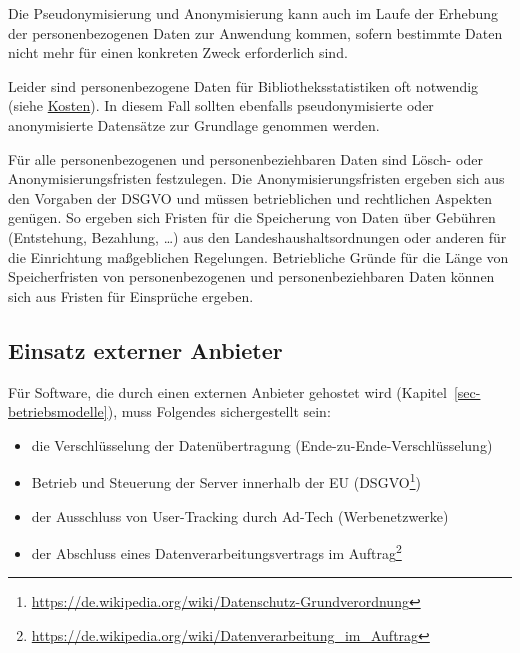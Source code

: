 \documentclass[
  11pt,
  letterpaper,
  DIV=11,
  twoside]{scrreprt}
\DeclareRobustCommand{\href}[2]{#2\footnote{\url{#1}}}
\begin{document}
Die Pseudonymisierung und Anonymisierung kann auch im Laufe der Erhebung
der personenbezogenen Daten zur Anwendung kommen, sofern bestimmte Daten
nicht mehr für einen konkreten Zweck erforderlich sind.

Leider sind personenbezogene Daten für Bibliotheksstatistiken oft
notwendig (siehe \hyperref[kosten]{Kosten}). In diesem Fall sollten
ebenfalls pseudonymisierte oder anonymisierte Datensätze zur Grundlage
genommen werden.

Für alle personenbezogenen und personenbeziehbaren Daten sind Lösch-
oder Anonymisierungsfristen festzulegen. Die Anonymisierungsfristen
ergeben sich aus den Vorgaben der DSGVO und müssen betrieblichen und
rechtlichen Aspekten genügen. So ergeben sich Fristen für die
Speicherung von Daten über Gebühren (Entstehung, Bezahlung, \ldots) aus
den Landeshaushaltsordnungen oder anderen für die Einrichtung
maßgeblichen Regelungen. Betriebliche Gründe für die Länge von
Speicherfristen von personenbezogenen und personenbeziehbaren Daten
können sich aus Fristen für Einsprüche ergeben.

\subsection{Einsatz externer Anbieter}\label{sec-datenschutz-externe}

Für Software, die durch einen externen Anbieter gehostet wird
(Kapitel~\ref{sec-betriebsmodelle}), muss Folgendes sichergestellt sein:

\begin{itemize}
\item
  die Verschlüsselung der Datenübertragung
  (Ende-zu-Ende-Verschlüsselung)
\item
  Betrieb und Steuerung der Server innerhalb der EU
  (\href{https://de.wikipedia.org/wiki/Datenschutz-Grundverordnung}{DSGVO})
\item
  der Ausschluss von User-Tracking durch Ad-Tech (Werbenetzwerke)
\item
  der Abschluss eines
  \href{https://de.wikipedia.org/wiki/Datenverarbeitung_im_Auftrag}{Datenverarbeitungsvertrags
  im Auftrag}
\end{itemize}
\end{document}
